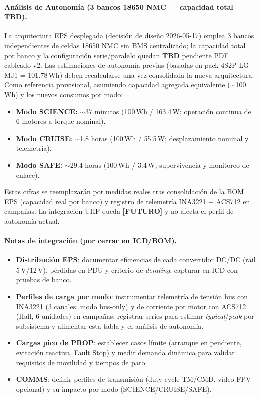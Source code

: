 \paragraph{Análisis de Autonomía (3 bancos 18650 NMC --- capacidad total \textbf{TBD}).}
La arquitectura EPS desplegada (decisión de diseño 2026-05-17) emplea 3 bancos independientes de celdas 18650 NMC sin BMS centralizado; la capacidad total por banco y la configuración serie/paralelo quedan \textbf{TBD} pendiente PDF cableado v2. Las estimaciones de autonomía previas (basadas en pack 4S2P LG MJ1 = 101.78\,Wh) deben recalcularse una vez consolidada la nueva arquitectura. Como referencia provisional, asumiendo capacidad agregada equivalente ($\sim$100\,Wh) y los nuevos consumos por modo:
\begin{itemize}
    \item \textbf{Modo SCIENCE:} $\sim$37 minutos (100\,Wh / 163.4\,W; operación continua de 6 motores a torque nominal).
    \item \textbf{Modo CRUISE:} $\sim$1.8 horas (100\,Wh / 55.5\,W; desplazamiento nominal y telemetría).
    \item \textbf{Modo SAFE:} $\sim$29.4 horas (100\,Wh / 3.4\,W; supervivencia y monitoreo de enlace).
\end{itemize}
Estas cifras se reemplazarán por medidas reales tras consolidación de la BOM EPS (capacidad real por banco) y registro de telemetría INA3221 + ACS712 en campañas. La integración UHF queda \textbf{[FUTURO]} y no afecta el perfil de autonomía actual.

\paragraph{Notas de integración (por cerrar en ICD/BOM).}
\begin{itemize}
  \item \textbf{Distribución EPS}: documentar eficiencias de cada convertidor DC/DC (rail 5\,V/12\,V), pérdidas en PDU y criterio de \emph{derating}; capturar en ICD con pruebas de banco. \cite{nasa_cm}
  \item \textbf{Perfiles de carga por modo}: instrumentar telemetría de tensión bus con INA3221 (3 canales, modo bus-only) y de corriente por motor con ACS712 (Hall, 6 unidades) en campañas; registrar series para estimar \emph{typical}/\emph{peak} por subsistema y alimentar esta tabla y el análisis de autonomía. \cite{nasa_cm}
  \item \textbf{Cargas pico de PROP}: establecer casos límite (arranque en pendiente, evitación reactiva, Fault Stop) y medir demanda dinámica para validar requisitos de movilidad y tiempos de paro. \cite{nasa_cm}
  \item \textbf{COMMS}: definir perfiles de transmisión (duty-cycle TM/CMD, vídeo FPV opcional) y su impacto por modo (SCIENCE/CRUISE/SAFE). \cite{nasa_cm}
\end{itemize}

